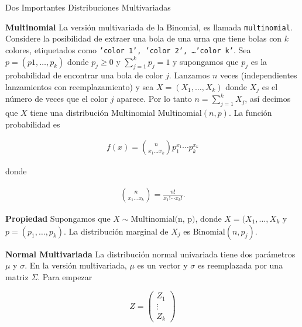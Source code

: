 \documentclass{article}\usepackage[]{graphicx}\usepackage[]{color}
\begin{document}
\vspace{0.8cm}


{\Large Dos Importantes Distribuciones Multivariadas}

\vspace{0.5cm}

\textbf{Multinomial} La versi\'on multivariada de la Binomial, es llamada \texttt{multinomial}. Considere la posibilidad de extraer una bola de una urna que tiene bolas con $k$ colores, etiquetados como \texttt{'color 1', 'color 2', \dots 'color k'}. Sea $p = (p1, \dots, p_k)$ donde $p_j \geq 0$ y $\sum_{j = 1}^{k}p_j = 1$ y supongamos que $p_j$ es la probabilidad de encontrar una bola de color $j$. Lanzamos $n$ veces (independientes lanzamientos con reemplazamiento) y sea $X = (X_1, \dots, X_k)$ donde $X_j$ es el n\'umero de veces que el color $j$ aparece. Por lo tanto $n = \sum_{j= 1}^{k}X_j$, as\'i decimos que $X$ tiene una distribuci\'on Multinomial $\mbox{Multinomial}(n,p)$. La funci\'on probabilidad es

\begin{align}
f(x) = \binom{n}{x_1\dots x_k}p_{1}^{x_1}\cdots p_{k}^{x_k}
\end{align}

\vspace{0.2cm}

donde 

\vspace{0.2cm}

\begin{align*}
\binom{n}{x_1\dots x_k} = \frac{n!}{x_1!\cdots x_k!}.
\end{align*}

\vspace{0.2cm}

\textbf{Propiedad} Supongamos que $X \sim \mbox{Multinomial(n, p)}$, donde $X = (X_1,\dots, X_k$ y $p = (p_1, \dots, p_k)$. La distribuci\'on marginal de $X_j$ es $\mbox{Binomial}(n, p_j)$.


\vspace{0.5cm}

\textbf{Normal Multivariada} La distribuci\'on normal univariada tiene dos par\'ametros  $\mu$ y $\sigma$. En la versi\'on multivariada, $\mu$ es un vector y $\sigma$ es reemplazada por una matriz $\Sigma$. Para empezar

\[
Z = \begin{pmatrix}
Z_1 \\
\vdots\\
Z_k
\end{pmatrix}
\]
\end{document}
